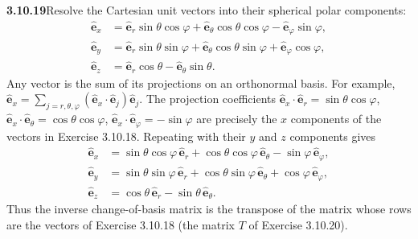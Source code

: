 \par\bigskip
\noindent\textbf{3.10.19}\quad Resolve the Cartesian unit vectors into their
spherical polar components:
\[
\begin{aligned}
\hat{\mathbf{e}}_{x}&=\hat{\mathbf{e}}_{r}\sin\theta\cos\varphi
+\hat{\mathbf{e}}_{\theta}\cos\theta\cos\varphi
-\hat{\mathbf{e}}_{\varphi}\sin\varphi,\\
\hat{\mathbf{e}}_{y}&=\hat{\mathbf{e}}_{r}\sin\theta\sin\varphi
+\hat{\mathbf{e}}_{\theta}\cos\theta\sin\varphi
+\hat{\mathbf{e}}_{\varphi}\cos\varphi,\\
\hat{\mathbf{e}}_{z}&=\hat{\mathbf{e}}_{r}\cos\theta
-\hat{\mathbf{e}}_{\theta}\sin\theta.
\end{aligned}
\]
\solution
Any vector is the sum of its projections on an orthonormal basis.
For example,
$\hat{\mathbf e}_x=\sum_{j=r,\theta,\varphi}
(\hat{\mathbf e}_x\cdot\hat{\mathbf e}_j)\hat{\mathbf e}_j$.
The projection coefficients
$\hat{\mathbf e}_x\cdot\hat{\mathbf e}_r=\sin\theta\cos\varphi$,
$\hat{\mathbf e}_x\cdot\hat{\mathbf e}_\theta=\cos\theta\cos\varphi$,
$\hat{\mathbf e}_x\cdot\hat{\mathbf e}_\varphi=-\sin\varphi$
are precisely the $x$ components of the vectors in Exercise 3.10.18.
Repeating with their $y$ and $z$ components gives
\[
\boxed{\begin{aligned}
\hat{\mathbf e}_x&=\sin\theta\cos\varphi\,\hat{\mathbf e}_r
+\cos\theta\cos\varphi\,\hat{\mathbf e}_\theta-\sin\varphi\,\hat{\mathbf e}_\varphi,\\
\hat{\mathbf e}_y&=\sin\theta\sin\varphi\,\hat{\mathbf e}_r
+\cos\theta\sin\varphi\,\hat{\mathbf e}_\theta+\cos\varphi\,\hat{\mathbf e}_\varphi,\\
\hat{\mathbf e}_z&=\cos\theta\,\hat{\mathbf e}_r-\sin\theta\,\hat{\mathbf e}_\theta.
\end{aligned}}
\]
Thus the inverse change-of-basis matrix is the transpose of the matrix
whose rows are the vectors of Exercise 3.10.18 (the matrix $T$ of
Exercise 3.10.20).

